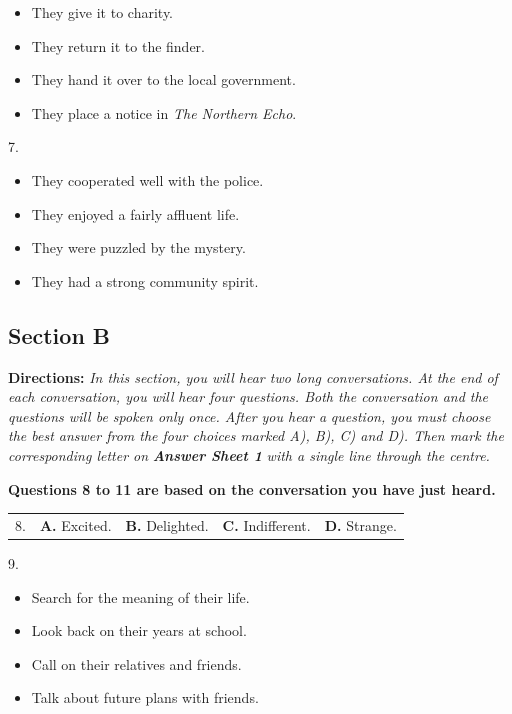 \documentclass[UTF8,11pt]{ctexart}
\begin{document}
\begin{itemize}[leftmargin=2em,itemsep=.2em,topsep=.4em]\item[A.] They give it to charity.
\item[B.] They return it to the finder.
\item[C.] They hand it over to the local government.
\item[D.] They place a notice in \textit{The Northern Echo}.
\end{itemize}

7.


\begin{itemize}[leftmargin=2em,itemsep=.2em,topsep=.4em]\item[A.] They cooperated well with the police.
\item[B.] They enjoyed a fairly affluent life.
\item[C.] They were puzzled by the mystery.
\item[D.] They had a strong community spirit.
\end{itemize}

\subsection*{\textbf{Section B}}


\textbf{Directions:} \textit{In this section, you will hear two long conversations. At the end of each conversation, you will} \textit{hear four questions. Both the conversation and the questions will be spoken only once. After you hear a} \textit{question, you must choose the best answer from the four choices marked A), B), C) and D). Then mark the} \textit{corresponding letter on }\textbf{\textit{Answer Sheet 1}}\textit{ with a single line through the centre.}


\textbf{Questions 8 to 11 are based on the conversation you have just heard.}


\noindent\begin{tabularx}{\linewidth}{@{}lXXXX@{}}8. & \textbf{A.} Excited. & \textbf{B.} Delighted. & \textbf{C.} Indifferent. & \textbf{D.} Strange.\\\end{tabularx}\par

9.


\begin{itemize}[leftmargin=2em,itemsep=.2em,topsep=.4em]\item[A.] Search for the meaning of their life.
\item[B.] Look back on their years at school.
\item[C.] Call on their relatives and friends.
\item[D.] Talk about future plans with friends.
\end{itemize}
\end{document}
